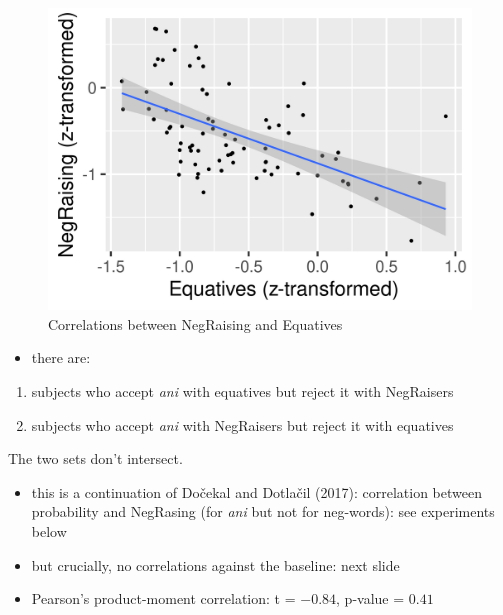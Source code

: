 \documentclass[
  ignorenonframetext,
]{beamer}
\providecommand{\tightlist}{%
  \setlength{\itemsep}{0pt}\setlength{\parskip}{0pt}}\usepackage{longtable,booktabs,array}
\begin{document}
\begin{frame}
\begin{figure}

{\centering \includegraphics{"correlations_ani.png"}

}

\caption{Correlations between NegRaising and Equatives}

\end{figure}
\end{frame}

\begin{frame}
\begin{itemize}
\tightlist
\item
  there are:
\end{itemize}

\begin{enumerate}
\item
  subjects who accept \emph{ani} with equatives but reject it with
  NegRaisers
\item
  subjects who accept \emph{ani} with NegRaisers but reject it with
  equatives
\end{enumerate}

The two sets don't intersect.

\begin{itemize}
\tightlist
\item
  this is a continuation of Dočekal and Dotlačil (2017): correlation
  between probability and NegRasing (for \emph{ani} but not for
  neg-words): see experiments below
\item
  but crucially, no correlations against the baseline: next slide
\item
  Pearson's product-moment correlation: t = \(-0.84\), p-value =
  \(0.41\)
\end{itemize}
\end{frame}
\end{document}
